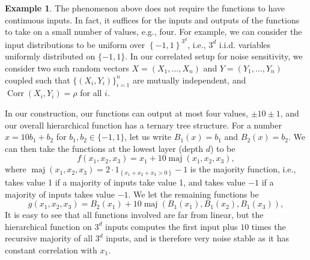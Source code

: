 \documentclass[12pt,letterpaper]{amsart}
\def\Corr{\operatorname{Corr}}
\def\maj{\operatorname{maj}}
\newcommand{\set}[1]{\left\{#1\right\}}
\newcommand{\1}[1]{1_{\left\{#1\right\}}}
\theoremstyle{definition}
\newtheorem{example}[theorem]{Example}
\theoremstyle{remark}
\begin{document}
\begin{example}\label{example:recursive_majority}
    The phenomenon above does not require the functions to have continuous inputs.
    In fact, it suffices for the inputs and outputs of the functions to take on a small number of values, e.g., four.
    For example, we can consider the input distributions to be uniform over $\set{-1,1}^{3^d}$, i.e., $3^d$ i.i.d. variables uniformly distributed on $\{-1,1\}$.
    In our correlated setup for noise sensitivity, we consider two such random vectors $X=(X_1,\dots,X_n)$ and $Y=(Y_1,\dots,Y_n)$ coupled such that $\{(X_i,Y_i)\}_{i=1}^n$ are mutually independent, and $\Corr(X_i,Y_i)=\rho$ for all $i$.

    In our construction, our functions can output at most four values, $\pm10\pm1$, and our overall hierarchical function has a ternary tree structure. 
    For a number $x=10b_1+b_2$ for $b_1,b_2\in\{-1,1\}$, let us write $B_1(x)=b_1$ and $B_2(x)=b_2$.
    We can then take the functions at the lowest layer (depth $d$) to be 
    \[ f(x_1,x_2,x_3)=x_1+10\maj(x_1,x_2,x_3), \]
    where $\maj(x_1,x_2,x_3)=2\cdot\1{x_1+x_2+x_3>0}-1$ is the majority function, i.e., takes value 1 if a majority of inputs take value 1, and takes value $-1$ if a majority of inputs takes value $-1$.
    We let the remaining functions be
    \[ g(x_1,x_2,x_3)=B_2(x_1)+10\maj(B_1(x_1),B_1(x_2),B_1(x_3)), \]
    It is easy to see that all functions involved are far from linear, 
    but the hierarchical function on $3^d$ inputs computes  the first input plus $10$ times the recursive majority of all $3^d$ inputs, and is therefore very noise stable as it has constant correlation with $x_1$.
\end{example}
\end{document}
